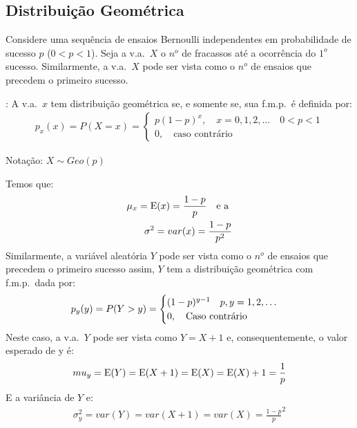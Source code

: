       \subsection{Distribuição Geométrica}
      \begin{description}
        \item  Considere uma sequência de ensaios Bernoulli independentes em probabilidade de 
      sucesso $p$ ($0<p<1$). Seja a v.a.\ $X$ o $n^o$ de fracassos até a ocorrência 
      do $1^o$ sucesso. Similarmente, a v.a.\ $X$ pode ser vista como o $n^o$ de ensaios que precedem 
      o primeiro sucesso.
    \item[Definição]: A v.a.\ $x$ tem distribuição geométrica se, e somente se, sua 
      f.m.p.\ é definida por: 
      \begin{align}
        p_{x}(x)=P(X=x)=\begin{cases}
          p(1-p)^x, \quad x=0,1,2,\dots \quad 0<p<1\\
          0, \quad \text{caso contrário}
        \end{cases}
      \end{align}
      \begin{center}Notação: $X \sim Geo(p)$\end{center}
      Temos que:
      \begin{align}
        \mu_{x}=\operatorname{E}(x)=\frac{1-p}{p} \text{\quad e a }\\
        \sigma^2 = var(x)=\frac{1-p}{p^2}
      \end{align}
      Similarmente, a variável aleatória $Y$ pode ser vista como o $n^o$ de ensaios que
      precedem o primeiro sucesso assim, $Y$ tem a distribuição geométrica com f.m.p.\ dada por:
        \begin{align}
        p_y(y)=P(Y>y)=\begin{cases}
          (1-p)^{y-1} \text{\quad }p,y=1,2,\dots \\
          0, \text{\quad Caso contrário}
        \end{cases}
      \end{align}
      Neste caso, a v.a.\ $Y$ pode ser vista como $Y=X+1$ e, consequentemente, o valor esperado de y é:
      \begin{align} 
      mu_y=\operatorname{E}(Y)=\operatorname{E}(X+1)=\operatorname{E}(X)=\operatorname{E}(X)+1= \frac{1}{p}
    \end{align}
    E a variância de $Y$ e:
    \begin{align}
      \sigma_y^2=var(Y)=var(X+1)=var(X)= \frac{1-p}{p}^2
    \end{align}

\end{description}
